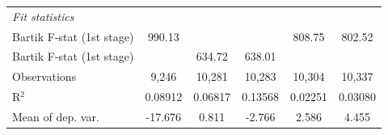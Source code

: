 \begin{tabular}{lccccc}
   \midrule
   \emph{Fit statistics}\\
   Bartik F-stat (1st stage)                                     & 990.13         &                    &                & 808.75        & 802.52\\  
   Bartik F-stat (1st stage)                                     &                & 634.72             & 638.01         &               & \\  
   Observations                                                          & 9,246          & 10,281             & 10,283         & 10,304        & 10,337\\  
   R$^2$                                                                 & 0.08912        & 0.06817            & 0.13568        & 0.02251       & 0.03080\\  
   Mean of dep. var.                                                     & -17.676        & 0.811              & -2.766         & 2.586         & 4.455\\  
\bottomrule
\end{tabular}
